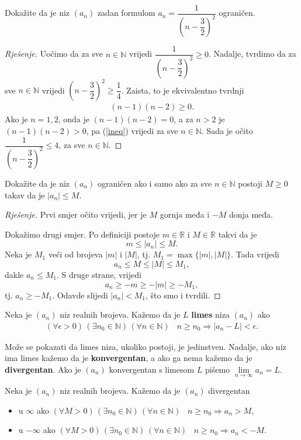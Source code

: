 \begin{exercise}
Dokažite da je niz $(a_n)$ zadan formulom $a_n=\dfrac{1}{\left(n-\dfrac{3}{2}\right)^2}$ ograničen.
\end{exercise}
\begin{proof}[Rješenje]
Uočimo da za sve $n\in \mathbb{N}$ vrijedi $\dfrac{1}{\left(n-\dfrac{3}{2}\right)^2}\geq 0$. Nadalje, tvrdimo da za sve $n\in \mathbb{N}$ vrijedi $\left(n-\dfrac{3}{2}\right)^2\geq \dfrac{1}{4}$. Zaista, to je ekvivalentno tvrdnji 
\begin{gather}
\label{ineq}
(n-1)(n-2)\geq 0.
\end{gather}
Ako je $n=1, 2$, onda je $(n-1)(n-2)=0$, a za $n>2$ je $(n-1)(n-2)>0$, pa (\ref{ineq}) vrijedi za sve $n\in \mathbb{N}$. Sada je očito $\dfrac{1}{\left(n-\dfrac{3}{2}\right)^2}\leq 4$, za sve $n\in \mathbb{N}$.
\end{proof}
\begin{exercise}
Dokažite da je niz $(a_n)$ ograničen ako i samo ako za sve $n\in \mathbb{N}$ postoji $M\geq 0$ takav da je $|a_n|\leq M$.
\end{exercise}
\begin{proof}[Rješenje]
Prvi smjer očito vrijedi, jer je $M$ gornja međa i $-M$ donja međa. 

Dokažimo drugi smjer. Po definiciji postoje $m\in \mathbb{R}$ i $M\in \mathbb{R}$ takvi da je $$m\leq |a_n|\leq M.$$ Neka je $M_1$ veći od brojeva $|m|$ i $|M|$, tj. $M_1=\max\{|m|, |M|\}$. Tada vrijedi $$a_n\leq M\leq |M|\leq M_1,$$
dakle $a_n\leq M_1$. S druge strane, vrijedi $$a_n\geq -m\geq -|m|\geq -M_1,$$ 
tj. $a_n\geq -M_1$. Odavde slijedi $|a_n|<M_1$, što smo i tvrdili.
\end{proof}

\begin{definition}
Neka je $(a_n)$ niz realnih brojeva. Kažemo da je $L$ \textbf{limes} niza $(a_n)$ ako
\begin{gather*}
(\forall \epsilon>0)\,(\exists n_0\in \mathbb{N})\, (\forall n\in \mathbb{N})\;\;\; n\geq n_0\Rightarrow |a_n-L|<\epsilon.
\end{gather*}
\end{definition}

Može se pokazati da limes niza, ukoliko postoji, je jedinstven. Nadalje, ako niz ima limes kažemo da je \textbf{konvergentan}, a ako ga nema kažemo da je \textbf{divergentan}. Ako je $(a_n)$ konvergentan s limesom $L$ pišemo $\lim\limits_{n\to \infty}{a_n}=L$.

\begin{definition}
Neka je $(a_n)$ niz realnih brojeva. Kažemo da je $(a_n)$ divergentan
\begin{itemize}
\item u $\mathbb{\infty}$ ako $(\forall M>0)\,(\exists n_0\in \mathbb{N})\,(\forall n\in \mathbb{N})\;\;\; n\geq n_0\Rightarrow a_n>M,$

\item u $-\mathbb{\infty}$ ako $(\forall M>0)\,(\exists n_0\in \mathbb{N})\,(\forall n\in \mathbb{N})\;\;\; n\geq n_0\Rightarrow a_n<-M.$
\end{itemize}
\end{definition}

